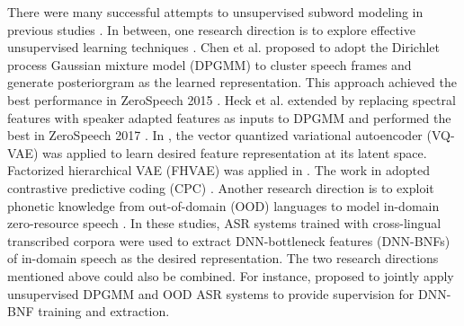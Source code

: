 \documentclass[a4paper]{article}
\begin{document}

There were many successful attempts to unsupervised subword modeling in previous studies \cite{chen2015parallel,heck2017feature,chorowski2019unsupervised,shibata2017composite,feng2019_TASLP,riviere2020unsupervised,Feng2019combining}. In between, one research direction is to explore effective unsupervised learning techniques 
\cite{chen2015parallel,heck2017feature,chorowski2019unsupervised}. Chen et al. \cite{chen2015parallel} proposed to adopt the Dirichlet process Gaussian mixture model (DPGMM) to cluster speech frames and generate posteriorgram as the learned  representation. This approach achieved the best performance in ZeroSpeech 2015 \cite{versteegh2015zero}. Heck et al. \cite{heck2017feature} extended \cite{chen2015parallel} by replacing spectral features with speaker adapted features as inputs to DPGMM and performed the best in ZeroSpeech 2017 \cite{heck2017feature}. 
In  \cite{chorowski2019unsupervised}, the vector quantized variational autoencoder (VQ-VAE) \cite{oord2017neural} was applied to learn desired feature representation at its latent space. Factorized hierarchical VAE (FHVAE) was applied in \cite{Feng2019improving}. 
The work in \cite{riviere2020unsupervised} adopted contrastive predictive coding (CPC) \cite{oord2018cpc}.
Another research direction is to exploit phonetic knowledge from out-of-domain (OOD) languages to model  in-domain zero-resource speech \cite{feng2019_TASLP,shibata2017composite}. In these studies, ASR systems trained with cross-lingual transcribed  corpora were used to extract  DNN-bottleneck features (DNN-BNFs) of in-domain speech as the desired representation.
The two research directions mentioned above could also be combined.
For instance, \cite{feng2019_TASLP} proposed 
to jointly  apply  unsupervised DPGMM  and OOD ASR systems to provide supervision for DNN-BNF training and extraction. 
\end{document}
